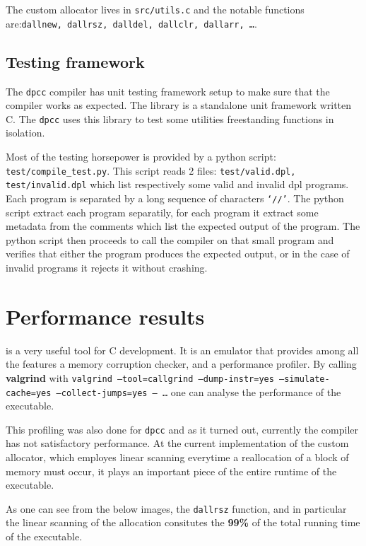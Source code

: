\documentclass[a4paper]{article}
\newcommand{\urlref}[3][blue]{\href{#2}{\color{#1}{#3}}}%
\begin{document}
The custom allocator lives in \texttt{src/utils.c} and the notable functions are:\texttt{dallnew, dallrsz, dalldel, dallclr, dallarr, \dots}.


\subsection{Testing framework}

The \texttt{dpcc} compiler has unit testing framework setup to make sure that the compiler works as expected.
The library \urlref{https://github.com/ThrowTheSwitch/Unity}{Unity} is a standalone unit framework written C. The
\texttt{dpcc} uses this library to test some utilities freestanding functions in isolation.

Most of the testing horsepower is provided by a python script: \texttt{test/compile\_test.py}.
This script reads 2 files: \texttt{test/valid.dpl, test/invalid.dpl} which list respectively some valid and invalid dpl programs.
Each program is separated by a long sequence of characters \texttt{`//'}. The python script extract each program
separatily, for each program it extract some metadata from the comments which list the expected output of the program.
The python script then proceeds to call the compiler on that small program and verifies that either the program
produces the expected output, or in the case of invalid programs it rejects it without crashing.



\section{Performance results}

\urlref{https://www.valgrind.org/}{Valgrind} is a very useful tool for C development. It is an emulator that provides among
all the features a memory corruption checker, and a performance profiler. By calling \textbf{valgrind} with
\texttt{valgrind --tool=callgrind --dump-instr=yes --simulate-cache=yes --collect-jumps=yes -- \dots} one can analyse
the performance of the executable.

This profiling was also done for \texttt{dpcc} and as it turned out, currently the compiler has not satisfactory performance.
At the current implementation of the custom allocator, which employes linear scanning everytime a reallocation of a block
of memory must occur, it plays an important piece of the entire runtime of the executable.

As one can see from the below images, the \texttt{dallrsz} function, and in particular the linear scanning of the allocation
consitutes the \textbf{99\%} of the total running time of the executable.
\end{document}
